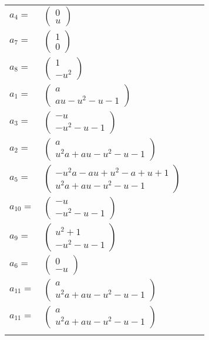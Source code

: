 \documentclass[1p]{elsarticle_modified}
\theoremstyle{definition}
\begin{document}
\begin{tabular}{m{7pt} m{180pt} m{7pt} m{180pt} }
\flushright $a_{4}=$&$\begin{pmatrix}0\\u\end{pmatrix}$ \\
\flushright $a_{7}=$&$\begin{pmatrix}1\\0\end{pmatrix}$ \\
\flushright $a_{8}=$&$\begin{pmatrix}1\\- u^2\end{pmatrix}$ \\
\flushright $a_{1}=$&$\begin{pmatrix}a\\a u- u^2- u-1\end{pmatrix}$ \\
\flushright $a_{3}=$&$\begin{pmatrix}- u\\- u^2- u-1\end{pmatrix}$ \\
\flushright $a_{2}=$&$\begin{pmatrix}a\\u^2 a+a u- u^2- u-1\end{pmatrix}$ \\
\flushright $a_{5}=$&$\begin{pmatrix}- u^2 a- a u+u^2- a+u+1\\u^2 a+a u- u^2- u-1\end{pmatrix}$ \\
\flushright $a_{10}=$&$\begin{pmatrix}- u\\- u^2- u-1\end{pmatrix}$ \\
\flushright $a_{9}=$&$\begin{pmatrix}u^2+1\\- u^2- u-1\end{pmatrix}$ \\
\flushright $a_{6}=$&$\begin{pmatrix}0\\- u\end{pmatrix}$ \\
\flushright $a_{11}=$&$\begin{pmatrix}a\\u^2 a+a u- u^2- u-1\end{pmatrix}$\\ \flushright $a_{11}=$&$\begin{pmatrix}a\\u^2 a+a u- u^2- u-1\end{pmatrix}$\\&\end{tabular}
\end{document}
